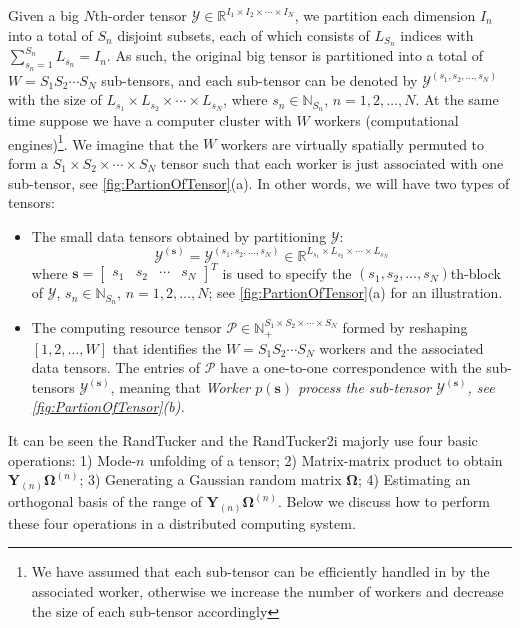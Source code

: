 \documentclass[10pt,twocolumn,twoside]{IEEEtran}
\newcommand{\mat}[1]{\ensuremath{\mathbf{#1}}}
\newcommand{\tensor}[1]{\ensuremath{\boldsymbol{\mathscr{#1}}}}
\newcommand{\tenmat}[2][n]{\ensuremath{{\mathbf{#2}}_{(#1)}}}
\newcommand{\matn}[2][n]{\ensuremath{\mathbf{#2}^{(#1)}}}
\newcommand{\Real}{\ensuremath{\mathbb{R}}}
\newcommand{\Natural}{\ensuremath{\mathbb{N}}}
\begin{document}
Given a big $N$th-order tensor $\tensor{Y}\in\Real^{I_1\times I_2\times \cdots\times I_N}$, we partition each dimension $I_n$ into a total of $S_n$ disjoint subsets, each of which consists of $L_{S_n}$ indices with $\sum_{s_n=1}^{S_n}L_{s_n}=I_n$. As such, the original big tensor is partitioned into a total of $W=S_1S_2\cdots S_N$ sub-tensors, and each sub-tensor can be denoted by $\tensor{Y}^{(s_1,s_2,\ldots,s_N)}$ with the size of ${L_{s_1}\times L_{s_2}\times\cdots\times L_{s_N}}$, where $s_n\in\Natural_{S_n}$, $n=1,2,\ldots,N$. At the same time suppose we have a computer cluster with $W$ workers (computational engines)\footnote{We have assumed that each sub-tensor can be efficiently handled in by the associated worker, otherwise we increase the number of workers and decrease the size of each sub-tensor accordingly}. We imagine that the $W$ workers are virtually spatially  permuted to form a $S_1\times S_2\times\cdots\times S_N$  tensor such that each worker is just associated with one sub-tensor, see \figurename \ref{fig:PartionOfTensor}(a). 
In other words, we will have two types of tensors:
\begin{itemize}
\item The small data tensors obtained by partitioning \tensor{Y}: 
\begin{equation}
\label{eq:subtensorBs}
\tensor{Y}^{(\mat{s})}=\tensor{Y}^{(s_1,s_2,\ldots,s_N)}\in\Real^{L_{s_1}\times L_{s_2} \times \cdots \times L_{s_N}}
\end{equation}
where $\mat{s}=\begin{bmatrix}
s_1 & s_2 & \cdots & s_N
\end{bmatrix}^T$ is used to specify the $(s_1,s_2,\ldots,s_N)$th-block of \tensor{Y}, $s_n\in\Natural_{S_n}$, $n=1,2,\ldots,N$; see \figurename \ref{fig:PartionOfTensor}(a) for an illustration.

\item
The computing resource tensor $\tensor{P}\in\Natural_+^{S_1\times S_2 \times \cdots \times S_N}$ formed by reshaping $[1,2,\ldots,W]$ that identifies the $W=S_1S_2\cdots S_N$ workers and the associated data tensors. The entries of \tensor{P} have a one-to-one correspondence with the sub-tensors $\tensor{Y}^{(\mat{s})}$, meaning that \emph{ Worker $p(\mat{s})$ process the sub-tensor $\tensor{Y}^{(\mat{s})}$, see \figurename \ref{fig:PartionOfTensor}(b).}






\end{itemize}
 It can be seen the RandTucker and the RandTucker2i majorly use four basic operations: 1)  Mode-$n$ unfolding of a tensor; 2) Matrix-matrix product to obtain $\tenmat{Y}\matn{\Omega}$;  3) Generating a Gaussian random matrix \mat{\Omega}; 4) Estimating an orthogonal basis of the range of $\tenmat{Y}\matn{\Omega}$. Below we discuss how to perform these four operations in a distributed computing system.
\end{document}
